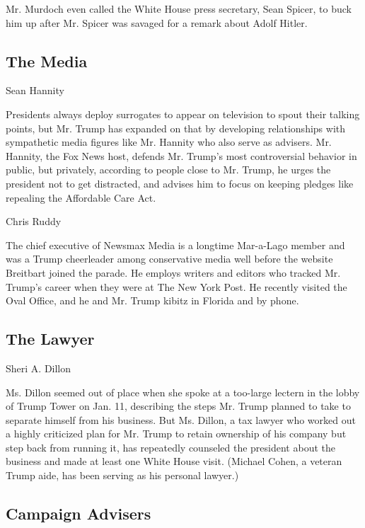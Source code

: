 Mr. Murdoch even called the White House press secretary, Sean Spicer, to
buck him up after Mr. Spicer was savaged for a remark about Adolf
Hitler.

\hypertarget{the-media}{%
\subsection{The Media}\label{the-media}}

Sean Hannity

Presidents always deploy surrogates to appear on television to spout
their talking points, but Mr. Trump has expanded on that by developing
relationships with sympathetic media figures like Mr. Hannity who also
serve as advisers. Mr. Hannity, the Fox News host, defends Mr. Trump's
most controversial behavior in public, but privately, according to
people close to Mr. Trump, he urges the president not to get distracted,
and advises him to focus on keeping pledges like repealing the
Affordable Care Act.

Chris Ruddy

The chief executive of Newsmax Media is a longtime Mar-a-Lago member and
was a Trump cheerleader among conservative media well before the website
Breitbart joined the parade. He employs writers and editors who tracked
Mr. Trump's career when they were at The New York Post. He recently
visited the Oval Office, and he and Mr. Trump kibitz in Florida and by
phone.

\hypertarget{the-lawyer}{%
\subsection{The Lawyer}\label{the-lawyer}}

Sheri A. Dillon

Ms. Dillon seemed out of place when she spoke at a too-large lectern in
the lobby of Trump Tower on Jan. 11, describing the steps Mr. Trump
planned to take to separate himself from his business. But Ms. Dillon, a
tax lawyer who worked out a highly criticized plan for Mr. Trump to
retain ownership of his company but step back from running it, has
repeatedly counseled the president about the business and made at least
one White House visit. (Michael Cohen, a veteran Trump aide, has been
serving as his personal lawyer.)

\hypertarget{campaign-advisers}{%
\subsection{Campaign Advisers}\label{campaign-advisers}}

